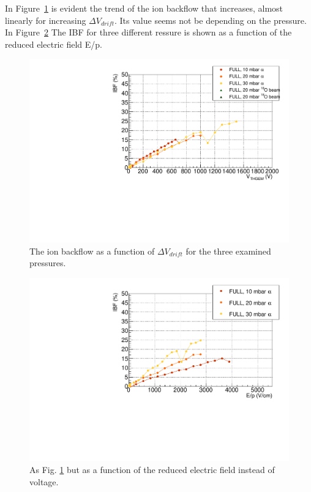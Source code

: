 \documentclass[a4paper, 11 pt]{report}
\newcommand{\Vdrift}{$ \Delta V_{drift}$}
\begin{document}
In Figure~\ref{fig:ion_backflow_FULL} is evident the trend of the ion backflow that increases, almost
linearly for increasing \Vdrift{}. Its value seems not be depending on the pressure.
In Figure~\ref{fig:ion_backflow_FULL_F} The IBF for three different ressure is shown as a function of
the reduced electric field E/p.

\begin{figure}[htbp]
	\centering
	\includegraphics[width=\textwidth]{Immagini/IBF_FULL_Comparison_nobeam.pdf}
	\caption{The ion backflow as a function of \Vdrift{} for the three examined pressures.}
	\label{fig:ion_backflow_FULL}
\end{figure}
\begin{figure}[htbp]
	\centering
	\includegraphics[width=\textwidth]{Immagini/IBF_FULL_Comparison_nobeam_F.pdf}
	\caption{As Fig. \ref{fig:ion_backflow_FULL} but as a function of the reduced electric field
	instead of voltage.}
	\label{fig:ion_backflow_FULL_F}
\end{figure}
\clearpage
\end{document}

